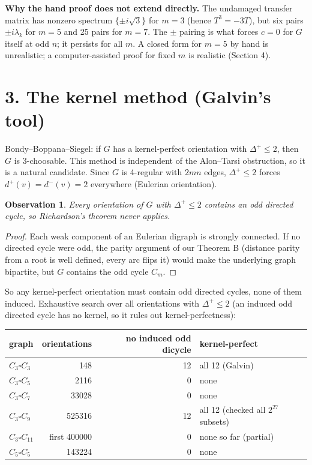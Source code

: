 \documentclass[11pt]{article}
\newtheorem{observation}{Observation}
\theoremstyle{remark}\newtheorem*{remark}{Remark}
\begin{document}
\textbf{Why the hand proof does not extend directly.} The undamaged transfer matrix
has nonzero spectrum $\{\pm i\sqrt3\}$ for $m=3$ (hence $T^3=-3T$), but six pairs
$\pm i\lambda_k$ for $m=5$ and 25 pairs for $m=7$. The $\pm$ pairing is what forces
$c=0$ for $G$ itself at odd $n$; it persists for all $m$. A closed form for $m=5$
by hand is unrealistic; a computer-assisted proof for fixed $m$ is realistic (Section 4).

\section*{3. The kernel method (Galvin's tool)}
Bondy--Boppana--Siegel: if $G$ has a kernel-perfect orientation with
$\Delta^+\le 2$, then $G$ is 3-choosable. This method is independent of the
Alon--Tarsi obstruction, so it is a natural candidate. Since $G$ is 4-regular with
$2mn$ edges, $\Delta^+\le2$ forces $d^+(v)=d^-(v)=2$ everywhere (Eulerian orientation).

\begin{observation}
Every orientation of $G$ with $\Delta^+\le 2$ contains an odd directed cycle, so
Richardson's theorem never applies.
\end{observation}
\begin{proof}
Each weak component of an Eulerian digraph is strongly connected. If no directed
cycle were odd, the parity argument of our Theorem B (distance parity from a root
is well defined, every arc flips it) would make the underlying graph bipartite, but
$G$ contains the odd cycle $C_m$.
\end{proof}
So any kernel-perfect orientation must contain odd directed cycles, none of them
induced. Exhaustive search over all orientations with $\Delta^+\le2$
(an induced odd directed cycle has no kernel, so it rules out kernel-perfectness):

\begin{center}
\begin{tabular}{@{}lrrl@{}}
\toprule
graph & orientations & no induced odd dicycle & kernel-perfect\\
\midrule
$C_3\square C_3$ & 148 & 12 & all 12 (Galvin)\\
$C_3\square C_5$ & 2116 & 0 & none\\
$C_3\square C_7$ & 33028 & 0 & none\\
$C_3\square C_9$ & 525316 & 12 & all 12 (checked all $2^{27}$ subsets)\\
$C_3\square C_{11}$ & first 400000 & 0 & none so far (partial)\\
$C_5\square C_5$ & 143224 & 0 & none\\
\bottomrule
\end{tabular}
\end{center}
\end{document}
